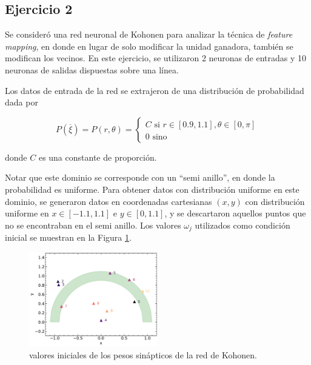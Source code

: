 \documentclass[11pt, twocolumn]{article}
\begin{document}
\subsection*{Ejercicio 2}
Se consideró una red neuronal de Kohonen para analizar la técnica de \textit{feature mapping}, en donde en lugar de solo modificar la unidad ganadora, también se modifican los vecinos. En este ejercicio, se utilizaron 2 neuronas de entradas y 10 neuronas de salidas dispuestas sobre una línea. 

Los datos de entrada de la red se extrajeron de una distribución de probabilidad dada por

\begin{equation} \nonumber
    P(\overline{\xi}) = P(r, \theta) =  
    \begin{cases}
        C \, \, \text{si } r \in [0.9, 1.1], \theta \in [0, \pi] \\
        0 \, \, \text{sino}
    \end{cases}
\end{equation}

\noindent donde \(C\) es una constante de proporción.

Notar que este dominio se corresponde con un ``semi anillo'', en donde la probabilidad es uniforme. Para obtener datos con distribución uniforme en este dominio, se generaron datos en coordenadas cartesianas \((x,y)\) con distribución uniforme en \(x \in [-1.1, 1.1]\) e \(y \in [0, 1.1]\), y se descartaron aquellos puntos que no se encontraban en el semi anillo. Los valores \(\omega_j\) utilizados como condición inicial se muestran en la Figura \ref{fig:cond_inicial}.

\begin{figure}
    \centering
    \includegraphics[width=0.5\textwidth]{figures/cond_inicial.pdf}
    \caption{valores iniciales de los pesos sinápticos de la red de Kohonen.}
    \label{fig:cond_inicial}
\end{figure}
\end{document}
